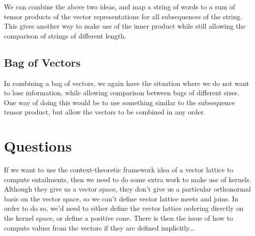 \documentclass{article}
\begin{document}
We can combine the above two ideas, and map a string of words to a sum
of tensor products of the vector representations for all subsequences
of the string. This gives another way to make use of the inner product
while still allowing the comparison of strings of different length.

\subsection*{Bag of Vectors}

In combining a bag of vectors, we again have the situation where we
do not want to lose information, while allowing comparison between
bags of different sizes. One way of doing this would be to use
something similar to the subsequence tensor product, but allow the
vectors to be combined in any order.

\section{Questions}

If we want to use the context-theoretic framework idea of a vector
lattice to compute entailments, then we need to do some extra work to
make use of kernels. Although they give us a vector space, they don't
give us a particular orthonormal basis on the vector space, so we
can't define vector lattice meets and joins. In order to do so, we'd
need to either define the vector lattice ordering directly on the
kernel space, or define a positive cone. There is then the issue of
how to compute values from the vectors if they are defined
implicitly\ldots


%

%
\end{document}
